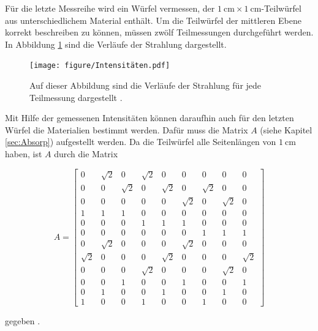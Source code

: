 \newpage

Für die letzte Messreihe wird ein Würfel vermessen, der  
$\SI{1}{\centi\meter} \times \SI{1}{\centi\meter}$-Teilwürfel aus unterschiedlichem Material
enthält. Um die Teilwürfel der mittleren Ebene korrekt beschreiben zu können, müssen 
zwölf Teilmessungen durchgeführt werden.
In Abbildung \ref{abb2} sind die Verläufe der Strahlung dargestellt.

\begin{figure}
	\centering
	\texttt{[image: figure/Intensitäten.pdf]}
	\caption{Auf dieser Abbildung sind die Verläufe der Strahlung für jede Teilmessung 
	dargestellt \cite{1}.}
	\label{abb2}
\end{figure}

Mit Hilfe der gemessenen Intensitäten können daraufhin auch für den letzten Würfel die 
Materialien bestimmt werden. Dafür muss die Matrix $A$ (siehe Kapitel \ref{sec:Absorp}) 
aufgestellt werden. Da die Teilwürfel alle Seitenlängen von 
$\SI{1}{\centi\meter}$ haben, ist $A$ durch die Matrix 

\begin{equation}
	A = 	 
	\begin{bmatrix}
		0 		 & \sqrt{2}  & 0 		& \sqrt{2} & 0 		  & 0 		 & 0 		& 0 	   & 0\\
		0 		 & 0 		 & \sqrt{2} & 0 	   & \sqrt{2} & 0 		 & \sqrt{2} & 0 	   & 0   \\
		0 		 & 0 		 & 0 		& 0 	   & 0 		  & \sqrt{2} & 0 		& \sqrt{2} & 0 \\
		1 		 & 1 		 & 1 		& 0 	   & 0 		  & 0        & 0 		& 0 	   & 0  \\
		0 		 & 0 		 & 0 		& 1 	   & 1		  & 1		 & 0		& 0		   & 0  \\
		0 		 & 0 		 & 0 		& 0		   & 0		  & 0		 & 1		& 1		   & 1  \\
		0 		 & \sqrt{2}  & 0 		& 0		   & 0		  & \sqrt{2} & 0		& 0		   & 0 \\
		\sqrt{2} & 0 		 & 0 		& 0		   & \sqrt{2} & 0		 & 0		& 0		   & \sqrt{2} \\
		0 		 & 0 		 & 0 		& \sqrt{2} & 0		  & 0		 & 0		& \sqrt{2} & 0  \\ 
		0 		 & 0 		 & 1 		& 0		   & 0		  & 1		 & 0		& 0		   & 1\\
		0 		 & 1 		 & 0 		& 0		   & 1		  & 0		 & 0		& 1		   & 0  \\
		1 		 & 0 		 & 0 		& 1		   & 0		  & 0		 & 1		& 0		   & 0  
	\end{bmatrix}
\end{equation}

gegeben \cite{sample}.
\newpage